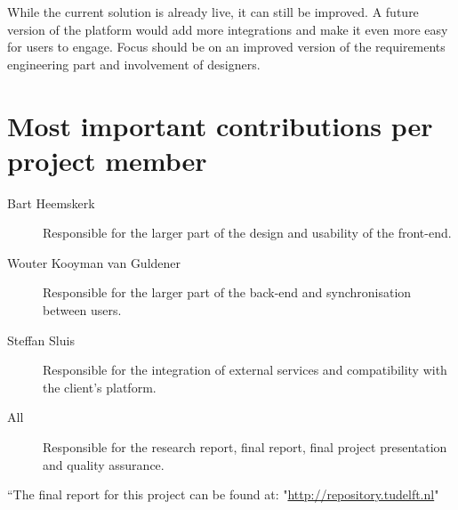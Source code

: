 While the current solution is already live, it can still be improved. A future version of the platform would add more integrations and make it even more easy for users to engage. Focus should be on an improved version of the requirements engineering part and involvement of designers.

\section{Most important contributions per project member}
\begin{description}
    \item[Bart Heemskerk] Responsible for the larger part of the design and usability of the front-end.
    \item[Wouter Kooyman van Guldener] Responsible for the larger part of the back-end and synchronisation between users.
    \item[Steffan Sluis] Responsible for the integration of external services and compatibility with the client's platform.
    \item[All] Responsible for the research report, final report, final project presentation and quality assurance.
\end{description}

“The final report for this project can be found at: 
        "\url{http://repository.tudelft.nl}"




    
